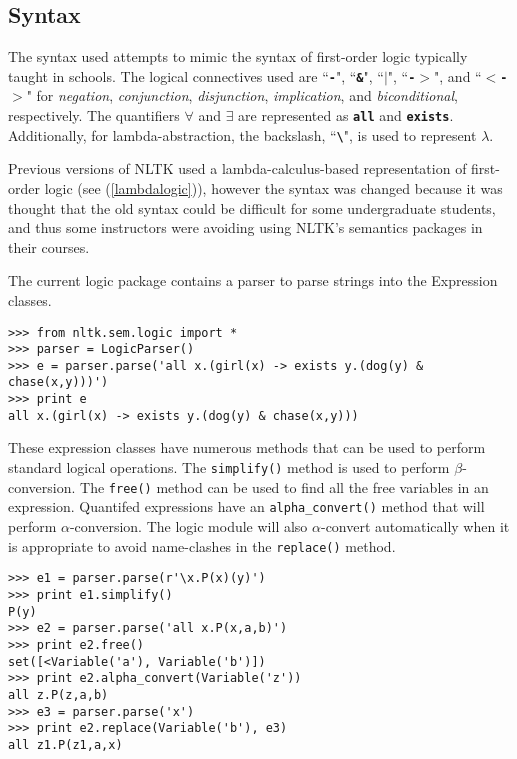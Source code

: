 \documentclass{article}
\newcommand{\dhgcode}[1]{{\tt #1}}
\begin{document}
\subsection{Syntax}
The syntax used attempts to mimic the syntax of first-order logic typically taught in schools.  The logical connectives used are ``\textbf{\dhgcode{-}}", ``\textbf{\dhgcode{\&}}", ``\textbf{\dhgcode{$|$}}", ``\textbf{\dhgcode{-$>$}}", and ``\textbf{\dhgcode{$<$-$>$}}" for \emph{negation}, \emph{conjunction}, \emph{disjunction}, \emph{implication}, and \emph{biconditional}, respectively.  The quantifiers $\forall$ and $\exists$ are represented as \textbf{\dhgcode{all}} and \textbf{\dhgcode{exists}}.  Additionally, for lambda-abstraction, the backslash, ``\textbf{\dhgcode{\textbackslash}}", is used to represent \textbf{\emph{$\lambda$}}.

Previous versions of NLTK used a lambda-calculus-based representation of first-order logic (see (\ref{lambdalogic})), however the syntax was changed because it was thought that the old syntax could be difficult for some undergraduate students, and thus some instructors were avoiding using NLTK's semantics packages in their courses.

\enumsentence{\label{lambdalogic}\dhgcode{all x.((girl x) implies (some y.((dog y) and (chase y x))))}}

The current logic package contains a parser to parse strings into the Expression classes.

\begin{verbatim}
>>> from nltk.sem.logic import *
>>> parser = LogicParser()
>>> e = parser.parse('all x.(girl(x) -> exists y.(dog(y) & 
chase(x,y)))')
>>> print e
all x.(girl(x) -> exists y.(dog(y) & chase(x,y)))
\end{verbatim}

These expression classes have numerous methods that can be used to perform standard logical operations.  The \dhgcode{simplify()} method is used to perform $\beta$-conversion.  The \dhgcode{free()} method can be used to find all the free variables in an expression.  Quantifed expressions have an \dhgcode{alpha\_convert()} method that will perform $\alpha$-conversion.  The logic module will also $\alpha$-convert automatically when it is appropriate to avoid name-clashes in the \dhgcode{replace()} method.

\begin{verbatim}
>>> e1 = parser.parse(r'\x.P(x)(y)')
>>> print e1.simplify()
P(y)
>>> e2 = parser.parse('all x.P(x,a,b)')
>>> print e2.free()
set([<Variable('a'), Variable('b')])
>>> print e2.alpha_convert(Variable('z'))
all z.P(z,a,b)
>>> e3 = parser.parse('x')
>>> print e2.replace(Variable('b'), e3)
all z1.P(z1,a,x)
\end{verbatim}
\end{document}
